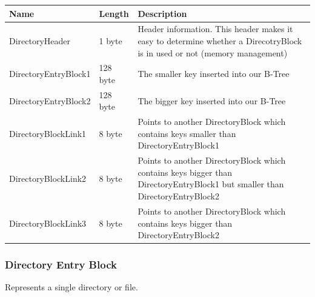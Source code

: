 \begin{tabular}{|l|l|p{5cm}|}
\hline
  \textbf{Name} & \textbf{Length} & \textbf{Description}
\\  \hline

DirectoryHeader & 1 byte & Header information. This header makes it easy to determine whether a DirecotryBlock is in used or not (memory management)

\\  \hline

DirectoryEntryBlock1 & 128 byte & The smaller key inserted into our B-Tree

\\  \hline

DirectoryEntryBlock2 & 128 byte & The bigger key inserted into our B-Tree

\\  \hline

DirectoryBlockLink1 & 8 byte & Points to another DirectoryBlock which contains keys smaller than DirectoryEntryBlock1

\\  \hline

DirectoryBlockLink2 & 8 byte & Points to another DirectoryBlock which contains keys bigger than DirectoryEntryBlock1 but smaller than DirectoryEntryBlock2

\\  \hline

DirectoryBlockLink3 & 8 byte & Points to another DirectoryBlock which contains keys bigger than DirectoryEntryBlock2

\\  \hline


\end{tabular}

\subsubsection*{Directory Entry Block}

Represents a single directory or file.

